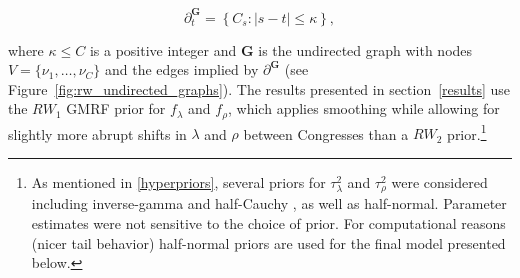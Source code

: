 \begin{equation*}
\partial^\mathbf{G}_t = \left\{C_s : \left| s - t \right| \leq \kappa \right\},
\end{equation*}

\noindent where $\kappa \leq C$ is a positive integer and $\mathbf{G}$ is the undirected graph 
with nodes $V = \{\nu_1, \dots, \nu_C\}$ and the edges implied by $\partial^\mathbf{G}$ 
(see Figure~\ref{fig:rw_undirected_graphs}). The results presented in section~\ref{results} use 
the $RW_1$ GMRF prior for $f_\lambda$ and $f_\rho$, which applies smoothing while allowing 
for slightly more abrupt shifts in $\lambda$ and $\rho$ between Congresses than a 
$RW_2$ prior.\footnote{As mentioned in \ref{hyperpriors}, several priors for $\tau^2_\lambda$ 
and $\tau^2_\rho$ were considered including inverse-gamma  
and half-Cauchy , as well as half-normal. Parameter estimates were 
not sensitive to the choice of prior. For computational reasons (nicer tail behavior) half-normal priors 
are used for the final model presented below.}
 


